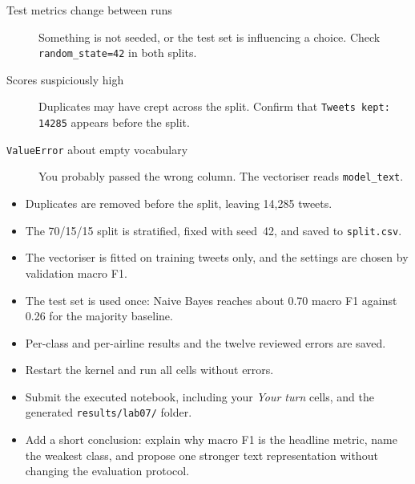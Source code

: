 \begin{troubleshoot}
\begin{description}
  \item[Test metrics change between runs] Something is not seeded, or the test set is influencing a choice. Check \texttt{random\_state=42} in both splits.
  \item[Scores suspiciously high] Duplicates may have crept across the split. Confirm that \texttt{Tweets kept: 14285} appears before the split.
  \item[\texttt{ValueError} about empty vocabulary] You probably passed the wrong column. The vectoriser reads \texttt{model\_text}.
\end{description}
\end{troubleshoot}

\begin{verification}
\begin{itemize}
  \item Duplicates are removed before the split, leaving 14,285 tweets.
  \item The 70/15/15 split is stratified, fixed with seed~42, and saved to \texttt{split.csv}.
  \item The vectoriser is fitted on training tweets only, and the settings are chosen by validation macro F1.
  \item The test set is used once: Naive Bayes reaches about 0.70 macro F1 against 0.26 for the majority baseline.
  \item Per-class and per-airline results and the twelve reviewed errors are saved.
\end{itemize}
\end{verification}

\begin{labdeliverable}
\begin{itemize}
  \item Restart the kernel and run all cells without errors.
  \item Submit the executed notebook, including your \emph{Your turn} cells, and the generated \texttt{results/lab07/} folder.
  \item Add a short conclusion: explain why macro F1 is the headline metric, name the weakest class, and propose one stronger text representation without changing the evaluation protocol.
\end{itemize}
\end{labdeliverable}
